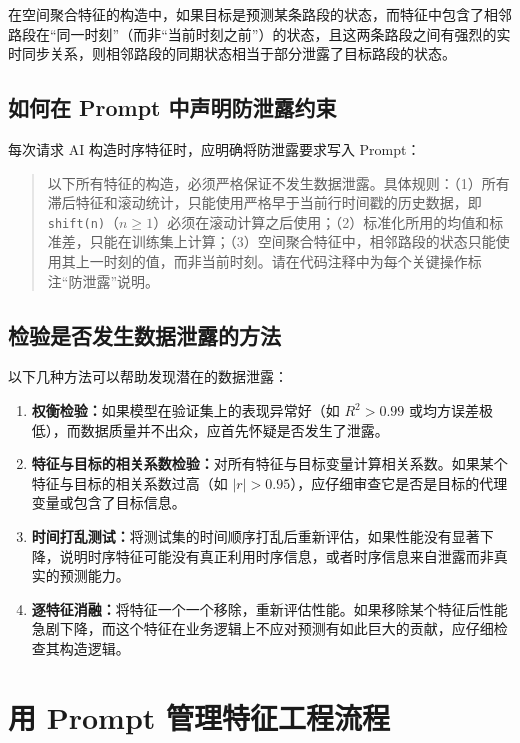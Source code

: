 在空间聚合特征的构造中，如果目标是预测某条路段的状态，而特征中包含了相邻路段在“同一时刻”（而非“当前时刻之前”）的状态，且这两条路段之间有强烈的实时同步关系，则相邻路段的同期状态相当于部分泄露了目标路段的状态。

\subsection{如何在 Prompt 中声明防泄露约束}

每次请求 AI 构造时序特征时，应明确将防泄露要求写入 Prompt：

\begin{quote}
以下所有特征的构造，必须严格保证不发生数据泄露。具体规则：（1）所有滞后特征和滚动统计，只能使用严格早于当前行时间戳的历史数据，即 \texttt{shift(n)}（$n \geq 1$）必须在滚动计算之后使用；（2）标准化所用的均值和标准差，只能在训练集上计算；（3）空间聚合特征中，相邻路段的状态只能使用其上一时刻的值，而非当前时刻。请在代码注释中为每个关键操作标注“防泄露”说明。
\end{quote}

\subsection{检验是否发生数据泄露的方法}

以下几种方法可以帮助发现潜在的数据泄露：

\begin{enumerate}
  \item \textbf{权衡检验：}如果模型在验证集上的表现异常好（如 $R^2 > 0.99$ 或均方误差极低），而数据质量并不出众，应首先怀疑是否发生了泄露。
  \item \textbf{特征与目标的相关系数检验：}对所有特征与目标变量计算相关系数。如果某个特征与目标的相关系数过高（如 $|r| > 0.95$），应仔细审查它是否是目标的代理变量或包含了目标信息。
  \item \textbf{时间打乱测试：}将测试集的时间顺序打乱后重新评估，如果性能没有显著下降，说明时序特征可能没有真正利用时序信息，或者时序信息来自泄露而非真实的预测能力。
  \item \textbf{逐特征消融：}将特征一个一个移除，重新评估性能。如果移除某个特征后性能急剧下降，而这个特征在业务逻辑上不应对预测有如此巨大的贡献，应仔细检查其构造逻辑。
\end{enumerate}


\section{用 Prompt 管理特征工程流程}

